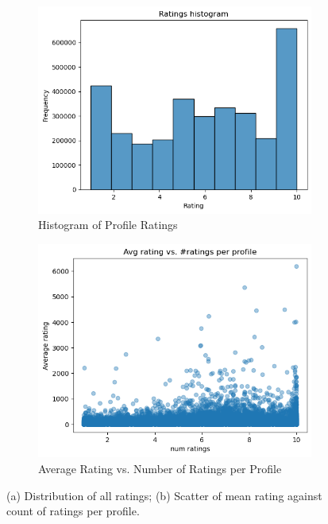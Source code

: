 \begin{figure}[H]
  \centering
  \begin{subfigure}[t]{0.348\textwidth}
    \centering
    \includegraphics[width=\linewidth]{../assets/hist.png}
    \caption{Histogram of Profile Ratings}
    \label{fig:hist-rating}
  \end{subfigure}
  \hspace{1cm}
  \begin{subfigure}[t]{0.34\textwidth}
    \centering
    \includegraphics[width=\linewidth]{../assets/output.png}
    \caption{Average Rating vs. Number of Ratings per Profile}
    \label{fig:rating-vs-count}
  \end{subfigure}
  \caption{(a) Distribution of all ratings; (b) Scatter of mean rating against count of ratings per profile.}
\end{figure}

